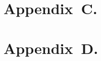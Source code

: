 \documentclass[../main.tex]{subfiles}
\begin{document}
\lipsum[1-3]



    \section*{Appendix~C.}
\addtocounter{section}{2}
\renewcommand{\thesection}{\arabic{section}}
    \label{appendix:3}

\lipsum[1-3]


    \section*{Appendix~D.}
\addtocounter{section}{3}
\renewcommand{\thesection}{\arabic{section}}
    \label{appendix:4}

\lipsum[1-3]

    
\end{document}
